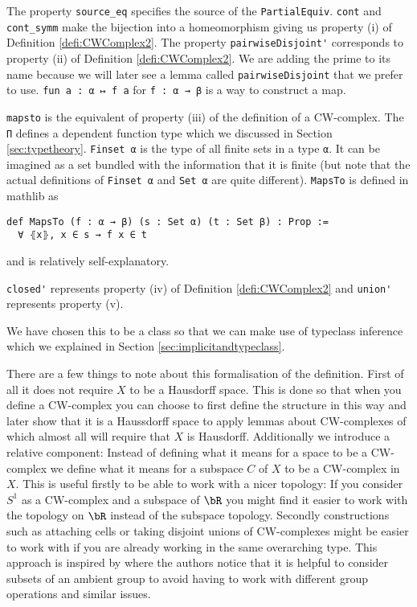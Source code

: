 The property \lstinline{source_eq} specifies the source of the \lstinline{PartialEquiv}. 
\lstinline{cont} and \lstinline{cont_symm} make the bijection into a homeomorphism giving us property (i) of Definition \ref{defi:CWComplex2}.
The property \lstinline{pairwiseDisjoint'} corresponds to property (ii) of Definition \ref{defi:CWComplex2}. 
We are adding the prime to its name because we will later see a lemma called \lstinline{pairwiseDisjoint} that we prefer to use. 
\lstinline{fun a : α ↦ f a} for \lstinline{f : α → β} is a way to construct a map.

\lstinline{mapsto} is the equivalent of property (iii) of the definition of a CW-complex. 
The \lstinline{Π} defines a dependent function type which we discussed in Section \ref{sec:typetheory}.
\lstinline{Finset α} is the type of all finite sets in a type \lstinline{α}. 
It can be imagined as a set bundled with the information that it is finite (but note that the actual definitions of \lstinline{Finset α} and \lstinline{Set α} are quite different).
\lstinline{MapsTo} is defined in mathlib as
\begin{lstlisting}
def MapsTo (f : α → β) (s : Set α) (t : Set β) : Prop := 
  ∀ ⦃x⦄, x ∈ s → f x ∈ t
\end{lstlisting}

and is relatively self-explanatory. 

\lstinline{closed'} represents property (iv) of Definition \ref{defi:CWComplex2} and \lstinline{union'} represents property (v). 

\medskip

We have chosen this to be a class so that we can make use of typeclass inference which we explained in Section \ref{sec:implicitandtypeclass}.

There are a few things to note about this formalisation of the definition. 
First of all it does not require $X$ to be a Hausdorff space. 
This is done so that when you define a CW-complex you can choose to first define the structure in this way and later show that it is a Haussdorff space to apply lemmas about CW-complexes of which almost all will require that $X$ is Hausdorff. 
Additionally we introduce a relative component: 
Instead of defining what it means for a space to be a CW-complex we define what it means for a subspace $C$ of $X$ to be a CW-complex in $X$.
This is useful firstly to be able to work with a nicer topology: 
If you consider $S^1$ as a CW-complex and a subspace of $\bR$ you might find it easier to work with the topology on $\bR$ instead of the subspace topology. 
Secondly constructions such as attaching cells or taking disjoint unions of CW-complexes might be easier to work with if you are already working in the same overarching type.
This approach is inspired by \cite{Gonthier2013} where the authors notice that it is helpful to consider subsets of an ambient group to avoid having to work with different group operations and similar issues. 

